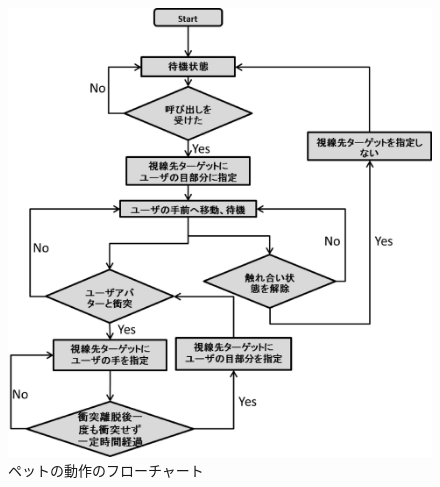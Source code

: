 \begin{figure}[H]
\centering
\includegraphics*[width=16cm,clip]{images/chart1.eps}
\caption{ペットの動作のフローチャート}
\label{fig:chart1}
\end{figure} 




